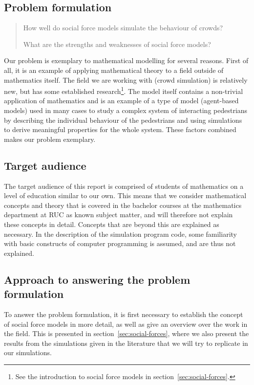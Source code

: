 \subsection{Problem formulation}
\begin{quote}
    How well do social force models simulate the behaviour of crowds?

    What are the strengths and weaknesses of social force models?
\end{quote}

Our problem is exemplary to mathematical modelling for several reasons. First 
of all, it is an example of applying mathematical theory to a field outside of 
mathematics itself. The field we are working with (crowd simulation) is 
relatively new, but has some established research\footnote{See the 
introduction to social force models in section~\ref{sec:social-forces}.}. The 
model itself contains a non-trivial application of mathematics and is an 
example of a type of model (agent-based models) used in many cases to study a 
complex system of interacting pedestrians by describing the individual 
behaviour of the pedestrians and using simulations to derive meaningful 
properties for the whole system. These factors combined makes our problem 
exemplary.

\subsection{Target audience}
The target audience of this report is comprised of students of mathematics on 
a level of education similar to our own. This means that we consider 
mathematical concepts and theory that is covered in the bachelor courses at 
the mathematics department at RUC as known subject matter, and will therefore 
not explain these concepts in detail. Concepts that are beyond this are 
explained as necessary. In the description of the simulation program code, 
some familiarity with basic constructs of computer programming is assumed, and 
are thus not explained.

\subsection{Approach to answering the problem formulation}
To answer the problem formulation, it is first necessary to establish the 
concept of social force models in more detail, as well as give an overview 
over the work in the field. This is presented in 
section~\ref{sec:social-forces}, where we also present the results from the 
simulations given in the literature that we will try to replicate in our 
simulations.

